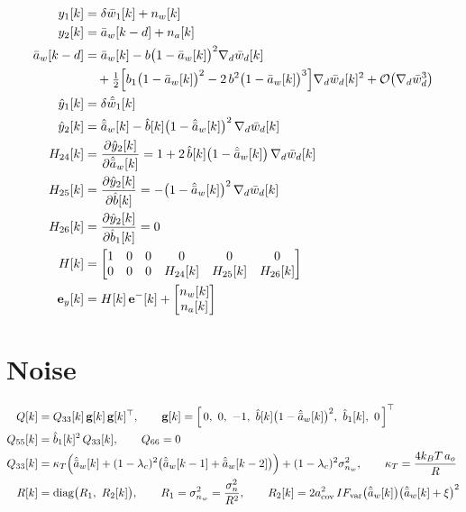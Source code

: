\documentclass[11pt,a4paper,fontset=none]{ctexart}
\newcommand{\ba}{\bar{a}}
\newcommand{\bw}{\bar{w}}
\newcommand{\ah}{\hat{\ba}_w}
\newcommand{\bh}{\hat{b}}
\newcommand{\bhh}{\hat{b}_1}
\begin{document}
\begin{align*}
y_1[k]      &= \delta\bw_1[k] + n_w[k] \\
y_2[k]      &= \ba_w[k-d] + n_a[k] \\
\ba_w[k-d]  &= \ba_w[k] - b\bigl(1-\ba_w[k]\bigr)^{2}\nabla_d\bw_d[k] \\
            &\quad + \tfrac{1}{2}\Bigl[b_1\bigl(1-\ba_w[k]\bigr)^{2} - 2\,b^{2}\bigl(1-\ba_w[k]\bigr)^{3}\Bigr]\nabla_d\bw_d[k]^{2}
               + \mathcal{O}\bigl(\nabla_d\bw_d^{3}\bigr) \\
\hat y_1[k] &= \delta\hat{\bw}_1[k] \\
\hat y_2[k] &= \ah[k] - \bh[k]\bigl(1-\ah[k]\bigr)^{2}\,\nabla_d\bw_d[k] \\
H_{24}[k]   &= \frac{\partial \hat y_2[k]}{\partial \ah[k]} = 1 + 2\,\bh[k]\bigl(1-\ah[k]\bigr)\,\nabla_d\bw_d[k] \\
H_{25}[k]   &= \frac{\partial \hat y_2[k]}{\partial \bh[k]} = -\bigl(1-\ah[k]\bigr)^{2}\,\nabla_d\bw_d[k] \\
H_{26}[k]   &= \frac{\partial \hat y_2[k]}{\partial \bhh[k]} = 0 \\
H[k]        &= \begin{bmatrix} 1 & 0 & 0 & 0 & 0 & 0 \\ 0 & 0 & 0 & H_{24}[k] & H_{25}[k] & H_{26}[k] \end{bmatrix} \\
\mathbf{e}_y[k] &= H[k]\,\mathbf{e}^{-}[k] + \begin{bmatrix} n_w[k] \\ n_a[k] \end{bmatrix}
\end{align*}

\section{Noise}

\begin{align*}
Q[k]      &= Q_{33}[k]\,\mathbf{g}[k]\,\mathbf{g}[k]^{\top}, \qquad
\mathbf{g}[k] = \Bigl[\,0,\ 0,\ -1,\ \bh[k]\bigl(1-\ah[k]\bigr)^{2},\ \bhh[k],\ 0\,\Bigr]^{\top} \\
Q_{55}[k] &= \bhh[k]^{2}\,Q_{33}[k], \qquad Q_{66} = 0 \\
Q_{33}[k] &= \kappa_T\Bigl(\ah[k] + (1-\lambda_c)^{2}\bigl(\ah[k-1] + \ah[k-2]\bigr)\Bigr) + (1-\lambda_c)^{2}\sigma^{2}_{n_w},
\qquad \kappa_T = \frac{4k_BT\,a_o}{R} \\
R[k]      &= \mathrm{diag}\bigl(R_1,\ R_2[k]\bigr), \qquad R_1 = \sigma^{2}_{n_w} = \frac{\sigma^{2}_{n}}{R^{2}}, \qquad
R_2[k] = 2a_{\mathrm{cov}}^{2}\,IF_{\mathrm{var}}\bigl(\ah[k]\bigr)\bigl(\ah[k] + \xi\bigr)^{2}
\end{align*}
\end{document}
